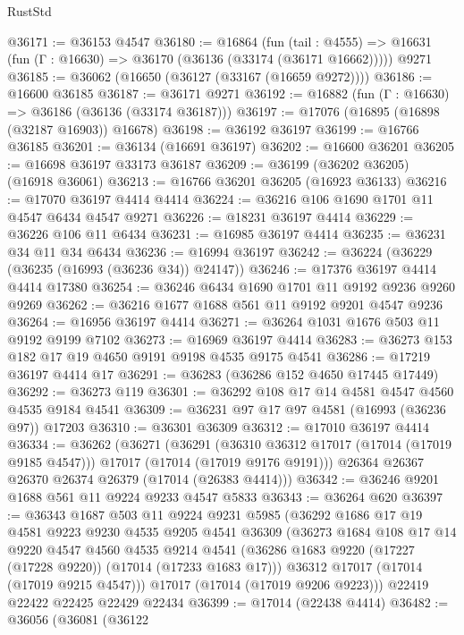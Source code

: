 \begin{lexlean}{RustStd}
\begin{coremodule}
{\begin{coremodule}
{{{{{{{{{{{{{{{{{{{{{{{{{{{{{{{{{{{{{{{{{{{{{{{{{{{{{{{@36171 := @36153 @4547
@36180 := @16864
    (fun (tail : @4555) => @16631 (fun (Γ : @16630) => @36170 (@36136 (@33174 (@36171 @16662)))))
    @9271
@36185 := @36062 (@16650 (@36127 (@33167 (@16659 @9272))))
@36186 := @16600 @36185
@36187 := @36171 @9271
@36192 := @16882 (fun (Γ : @16630) => @36186 (@36136 (@33174 @36187)))
@36197 := @17076 (@16895 (@16898 (@32187 @16903)) @16678)
@36198 := @36192 @36197
@36199 := @16766 @36185
@36201 := @36134 (@16691 @36197)
@36202 := @16600 @36201
@36205 := @16698 @36197 @33173 @36187
@36209 := @36199 (@36202 @36205) (@16918 @36061)
@36213 := @16766 @36201 @36205 (@16923 @36133)
@36216 := @17070 @36197 @4414 @4414
@36224 := @36216 @106 @1690 @1701 @11 @4547 @6434 @4547 @9271
@36226 := @18231 @36197 @4414
@36229 := @36226 @106 @11 @6434
@36231 := @16985 @36197 @4414
@36235 := @36231 @34 @11 @34 @6434
@36236 := @16994 @36197
@36242 := @36224 (@36229 (@36235 (@16993 (@36236 @34)) @24147))
@36246 := @17376 @36197 @4414 @4414 @17380
@36254 := @36246 @6434 @1690 @1701 @11 @9192 @9236 @9260 @9269
@36262 := @36216 @1677 @1688 @561 @11 @9192 @9201 @4547 @9236
@36264 := @16956 @36197 @4414
@36271 := @36264 @1031 @1676 @503 @11 @9192 @9199 @7102
@36273 := @16969 @36197 @4414
@36283 := @36273 @153 @182 @17 @19 @4650 @9191 @9198 @4535 @9175 @4541
@36286 := @17219 @36197 @4414 @17
@36291 := @36283 (@36286 @152 @4650 @17445 @17449)
@36292 := @36273 @119
@36301 := @36292 @108 @17 @14 @4581 @4547 @4560 @4535 @9184 @4541
@36309 := @36231 @97 @17 @97 @4581 (@16993 (@36236 @97)) @17203
@36310 := @36301 @36309
@36312 := @17010 @36197 @4414
@36334 := @36262
    (@36271
      (@36291
        (@36310 @36312 @17017 (@17014 (@17019 @9185 @4547)))
        @17017
        (@17014 (@17019 @9176 @9191)))
      @26364
      @26367
      @26370
      @26374
      @26379
      (@17014 (@26383 @4414)))
@36342 := @36246 @9201 @1688 @561 @11 @9224 @9233 @4547 @5833
@36343 := @36264 @620
@36397 := @36343
    @1687
    @503
    @11
    @9224
    @9231
    @5985
    (@36292
      @1686
      @17
      @19
      @4581
      @9223
      @9230
      @4535
      @9205
      @4541
      @36309
      (@36273
        @1684
        @108
        @17
        @14
        @9220
        @4547
        @4560
        @4535
        @9214
        @4541
        (@36286 @1683 @9220 (@17227 (@17228 @9220)) (@17014 (@17233 @1683 @17)))
        @36312
        @17017
        (@17014 (@17019 @9215 @4547)))
      @17017
      (@17014 (@17019 @9206 @9223)))
    @22419
    @22422
    @22425
    @22429
    @22434
@36399 := @17014 (@22438 @4414)
@36482 := @36056
    (@36081
      (@36122
}}}}}}}}}}}}}}}}}}}}}}}}}}}}}}}}}}}}}}}}}}}}}}}}}}}}}}}
\end{coremodule}}
\end{coremodule}
\end{lexlean}
